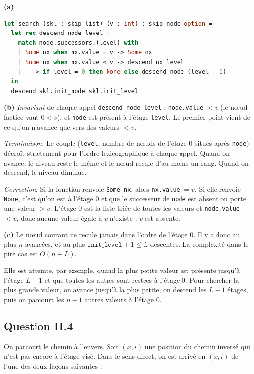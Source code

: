 \documentclass[11pt,a4paper]{article}
\begin{document}
\textbf{(a)}

\begin{lstlisting}[language=Caml]
let search (skl : skip_list) (v : int) : skip_node option =
  let rec descend node level =
    match node.successors.(level) with
    | Some nx when nx.value = v -> Some nx
    | Some nx when nx.value < v -> descend nx level
    | _ -> if level = 0 then None else descend node (level - 1)
  in
  descend skl.init_node skl.init_level
\end{lstlisting}

\textbf{(b)} \emph{Invariant} de chaque appel \texttt{descend\ node\ level} : \texttt{node.value} \(<v\) (le nœud factice vaut \(0<v\)), et \texttt{node} est présent à l'étage \texttt{level}. Le premier point vient de ce qu'on n'avance que vers des valeurs \(<v\).

\emph{Terminaison.} Le couple (\texttt{level}, nombre de nœuds de l'étage 0 situés après \texttt{node}) décroît strictement pour l'ordre lexicographique à chaque appel. Quand on avance, le niveau reste le même et le nœud recule d'au moins un rang. Quand on descend, le niveau diminue.

\emph{Correction.} Si la fonction renvoie \texttt{Some\ nx}, alors \texttt{nx.value} \(=v\). Si elle renvoie \texttt{None}, c'est qu'on est à l'étage 0 et que le successeur de \texttt{node} est absent ou porte une valeur \(>v\). L'étage 0 est la liste triée de toutes les valeurs et \texttt{node.value} \(<v\), donc aucune valeur égale à \(v\) n'existe : \(v\) est absente.

\textbf{(c)} Le nœud courant ne recule jamais dans l'ordre de l'étage 0. Il y a donc au plus \(n\) avancées, et au plus \(\texttt{init\_level}+1\le L\) descentes. La complexité dans le pire cas est \(\boxed{O(n+L)}\).

Elle est atteinte, par exemple, quand la plus petite valeur est présente jusqu'à l'étage \(L-1\) et que toutes les autres sont restées à l'étage 0. Pour chercher la plus grande valeur, on avance jusqu'à la plus petite, on descend les \(L-1\) étages, puis on parcourt les \(n-1\) autres valeurs à l'étage 0.

\hypertarget{question-ii.4}{%
\subsection{Question II.4}\label{question-ii.4}}

On parcourt le chemin à l'envers. Soit \((x,i)\) une position du chemin inversé qui n'est pas encore à l'étage visé. Dans le sens direct, on est arrivé en \((x,i)\) de l'une des deux façons suivantes :
\end{document}

